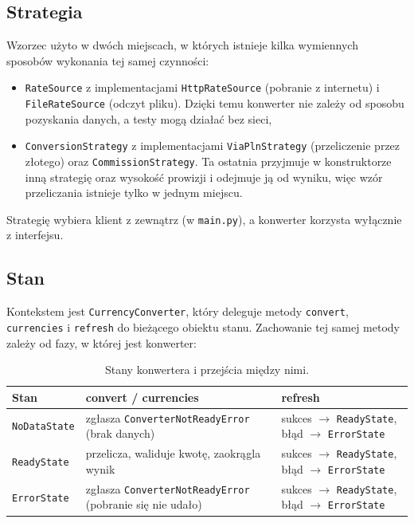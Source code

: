 \documentclass[12pt,a4paper]{article}
\begin{document}
\subsection{Strategia}

Wzorzec użyto w dwóch miejscach, w których istnieje kilka wymiennych sposobów wykonania tej samej czynności:
\begin{itemize}
    \item \texttt{RateSource} z implementacjami \texttt{HttpRateSource} (pobranie z internetu) i \texttt{FileRateSource} (odczyt pliku). Dzięki temu konwerter nie zależy od sposobu pozyskania danych, a testy mogą działać bez sieci,
    \item \texttt{ConversionStrategy} z implementacjami \texttt{ViaPlnStrategy} (przeliczenie przez złotego) oraz \texttt{CommissionStrategy}. Ta ostatnia przyjmuje w konstruktorze inną strategię oraz wysokość prowizji i odejmuje ją od wyniku, więc wzór przeliczania istnieje tylko w jednym miejscu.
\end{itemize}
Strategię wybiera klient z zewnątrz (w \texttt{main.py}), a konwerter korzysta wyłącznie z interfejsu.

\subsection{Stan}

Kontekstem jest \texttt{CurrencyConverter}, który deleguje metody \texttt{convert}, \texttt{currencies} i \texttt{refresh} do bieżącego obiektu stanu. Zachowanie tej samej metody zależy od fazy, w której jest konwerter:

\begin{table}[H]
    \centering
    \begin{tabular}{@{}lp{4.2cm}p{5cm}@{}}
        \toprule
        \textbf{Stan} & \textbf{convert / currencies} & \textbf{refresh} \\
        \midrule
        \texttt{NoDataState} & zgłasza \texttt{ConverterNotReadyError} (brak danych) & sukces $\rightarrow$ \texttt{ReadyState}, błąd $\rightarrow$ \texttt{ErrorState} \\
        \texttt{ReadyState} & przelicza, waliduje kwotę, zaokrągla wynik & sukces $\rightarrow$ \texttt{ReadyState}, błąd $\rightarrow$ \texttt{ErrorState} \\
        \texttt{ErrorState} & zgłasza \texttt{ConverterNotReadyError} (pobranie się nie udało) & sukces $\rightarrow$ \texttt{ReadyState}, błąd $\rightarrow$ \texttt{ErrorState} \\
        \bottomrule
    \end{tabular}
    \caption{Stany konwertera i przejścia między nimi.}
\end{table}
\end{document}
